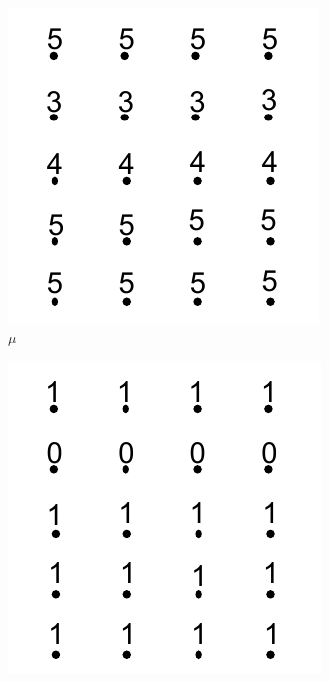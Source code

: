 \begin{figure}[!t]
\centering
\begin{subfigure}{0.243\linewidth}
\includegraphics[width=\linewidth]{Images/mu.pdf}
\vspace{-5mm}
\caption{${\mu}$}
\label{fig:mu}
\end{subfigure}
\begin{subfigure}{0.243\linewidth}
\includegraphics[width=\linewidth]{Images/bvolumeT.pdf}

\end{subfigure}
\end{figure}
